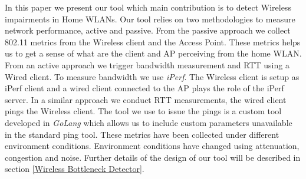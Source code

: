 In this paper we present our tool which main contribution is to detect Wireless impairments in Home WLANs. Our tool relies on two methodologies to measure network performance, active and passive. From the passive approach we collect 802.11 metrics from the Wireless client and the Access Point. These metrics helps us to get a sense of what are the client and AP perceiving from the home WLAN. From an active approach we trigger bandwidth measurement and RTT using a Wired client. To measure bandwidth we use \emph{iPerf}. The Wireless client is setup as iPerf client and a wired client connected to the AP plays the role of the iPerf server. In a similar approach we conduct RTT measurements, the wired client pings the Wireless client. The tool we use to issue the pings is a custom tool developed in \emph{GoLang} which allows us to include custom parameters unavailable in the standard ping tool. These metrics have been collected under different  environment conditions. Environment conditions have changed using attenuation, congestion and noise. Further details of the design of our tool will be described in section \ref{Wireless Bottleneck Detector}. 


